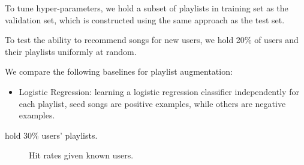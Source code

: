 To tune hyper-parameters, we hold a subset of playlists in training set as the validation set, 
which is constructed using the same approach as the test set.

To test the ability to recommend songs for new users, we hold 20\% of users and their playlists uniformly at random.

We compare the following baselines for playlist augmentation:
\begin{itemize}
\item Logistic Regression: learning a logistic regression classifier independently for each playlist,
      seed songs are positive examples, while others are negative examples.
\end{itemize}


\begin{table}[!h]
\centering
\caption{Statistics of dataset for playlist generation for known users}
\label{tab:stats_cold}
\end{table}

hold 30\% users' playlists.
\begin{table}[!h]
\centering
\caption{Statistics of dataset for playlist generation for new users}
\label{tab:stats_cold}
\end{table}



\begin{figure}[!h]
\centering
\caption{Hit rates given known users.}
\end{figure}

